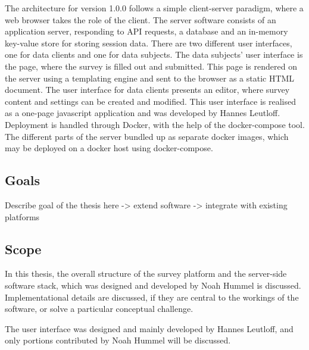 \documentclass[a4paper,11pt]{article}
\begin{document}
            The architecture for version 1.0.0 follows a simple client-server paradigm, where
            a web browser takes the role of the client. The server software consists of an
            application server, responding to API requests, a database and an in-memory
            key-value store for storing session data. There are two different user interfaces,
            one for data clients and one for data subjects. The data subjects' user interface
            is the page, where the survey is filled out and submitted. This page is rendered
            on the server using a templating engine and sent to the browser as a static HTML document.
            The user interface for data clients presents an editor, where survey content and settings 
            can be created and modified. This user interface is realised as a one-page
            javascript application and was developed by Hannes Leutloff. Deployment is handled through
            Docker, with the help of the docker-compose tool. The different parts of the server
            bundled up as separate docker images, which may be deployed on a docker host using
            docker-compose.

        \subsection{Goals}
            Describe goal of the thesis here
            -> extend software
            -> integrate with existing platforms

        \subsection{Scope}

            In this thesis, the overall structure of the survey platform and the server-side
            software stack, which was designed and developed by Noah Hummel is discussed.
            Implementational details are discussed, if they are central to the workings
            of the software, or solve a particular conceptual challenge.

            The user interface was designed and mainly developed by Hannes Leutloff, and
            only portions contributed by Noah Hummel will be discussed.
\end{document}
